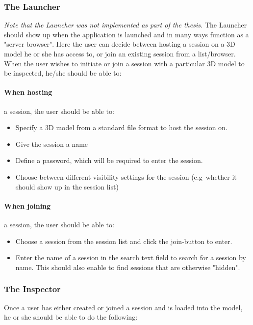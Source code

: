 \subsubsection{The Launcher}
\textit{Note that the Launcher was not implemented as part of the thesis.}
The Launcher should show up when the application is launched and in many ways function as a "server browser".
Here the user can decide between hosting a session on a 3D model he or she has access to, or join an existing session from a list/browser.
When the user wishes to initiate or join a session with a particular 3D model to be inspected, he/she should be able to:

\paragraph{When hosting}a session, the user should be able to:
\begin{itemize}
	\item Specify a 3D model from a standard file format to host the session on.
	\item Give the session a name
	\item Define a password, which will be required to enter the session. 
	\item Choose between different visibility settings for the session (e.g~whether it should show up in the session list)
\end{itemize}

\paragraph{When joining}a session, the user  should be able to:
\begin{itemize}
	\item Choose a session from the session list and click the join-button to enter.
	\item Enter the name of a session in the search text field to search for a session by name.
			This should also enable to find sessions that are otherwise "hidden".
\end{itemize}	


\subsubsection{The Inspector}
Once a user has either created or joined a session and is loaded into the model, he or she should be able to do the following:

